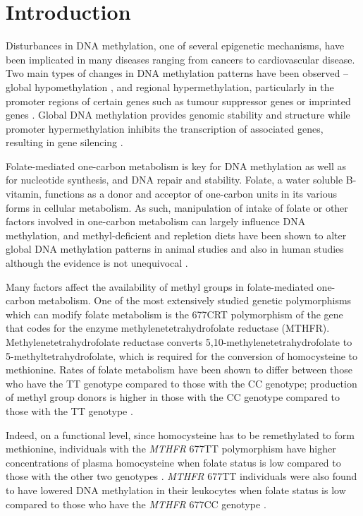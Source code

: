 \newpage

\section[]{Introduction} %
\noindent Disturbances in DNA methylation, one of several epigenetic mechanisms, have been implicated in many diseases ranging from cancers to cardiovascular disease. Two main types of changes in DNA methylation patterns have been observed -- global hypomethylation \cite{c41}, and regional hypermethylation, particularly in the promoter regions of certain genes such as tumour suppressor genes or imprinted genes \cite{c42,c43,c44}. Global DNA methylation provides genomic stability and structure \cite{c45} while promoter hypermethylation inhibits the transcription of associated genes, resulting in gene silencing \cite{c46}.

\noindent Folate-mediated one-carbon metabolism is key for DNA methylation as well as for nucleotide synthesis, and DNA repair and stability. Folate, a water soluble B-vitamin, functions as a donor and acceptor of one-carbon units in its various forms in cellular metabolism. As such, manipulation of intake of folate or other factors involved in one-carbon metabolism can largely influence DNA methylation, and methyl-deficient and repletion diets have been shown to alter global DNA methylation patterns in animal studies \cite{c47} and also in human studies \cite{c48,c49} although the evidence is not unequivocal \cite{c410,c411}.

\noindent Many factors affect the availability of methyl groups in folate-mediated one-carbon metabolism. One of the most extensively studied genetic polymorphisms which can modify folate metabolism is the 677CRT polymorphism of the gene that codes for the enzyme methylenetetrahydrofolate reductase (MTHFR). Methylenetetrahydrofolate reductase converts 5,10-methylenetetrahydrofolate to 5-methyltetrahydrofolate, which is required for the conversion of homocysteine to methionine. Rates of folate metabolism have been shown to differ between those who have the TT genotype compared to those with the CC genotype; production of methyl group donors is higher in those with the CC genotype compared to those with the TT genotype \cite{c412}.

\noindent Indeed, on a functional level, since homocysteine has to be remethylated to form methionine, individuals with the \emph{MTHFR} 677TT polymorphism have higher concentrations of plasma homocysteine when folate status is low compared to those with the other two genotypes \cite{c413,c414}. \emph{MTHFR} 677TT individuals were also found to have lowered DNA methylation in their leukocytes when folate status is low compared to those who have the \emph{MTHFR} 677CC genotype \cite{c415}.

